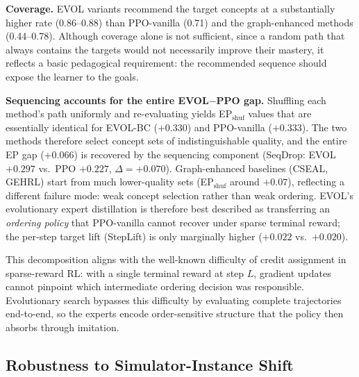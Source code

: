 \documentclass[sigconf,anonymous]{acmart}
\newcommand{\ours}{\textrm{EVOL}}
\begin{document}
\textbf{Coverage.}
\ours{} variants recommend the target concepts at a substantially higher rate (0.86--0.88) than PPO-vanilla (0.71) and the graph-enhanced methods (0.44--0.78). Although coverage alone is not sufficient, since a random path that always contains the targets would not necessarily improve their mastery, it reflects a basic pedagogical requirement: the recommended sequence should expose the learner to the goals.

\textbf{Sequencing accounts for the entire \ours{}$-$PPO gap.}
Shuffling each method's path uniformly and re-evaluating yields EP$_\text{shuf}$ values that are essentially identical for \ours{}-BC ($+0.330$) and PPO-vanilla ($+0.333$). The two methods therefore select concept sets of indistinguishable quality, and the entire EP gap (+0.066) is recovered by the sequencing component (SeqDrop: \ours{} $+0.297$ vs.\ PPO $+0.227$, $\Delta=+0.070$). Graph-enhanced baselines (CSEAL, GEHRL) start from much lower-quality sets (EP$_\text{shuf}$ around $+0.07$), reflecting a different failure mode: weak concept selection rather than weak ordering. \ours{}'s evolutionary expert distillation is therefore best described as transferring an \emph{ordering policy} that PPO-vanilla cannot recover under sparse terminal reward; the per-step target lift (StepLift) is only marginally higher ($+0.022$ vs.\ $+0.020$).

This decomposition aligns with the well-known difficulty of credit assignment in sparse-reward RL: with a single terminal reward at step $L$, gradient updates cannot pinpoint which intermediate ordering decision was responsible. Evolutionary search bypasses this difficulty by evaluating complete trajectories end-to-end, so the experts encode order-sensitive structure that the policy then absorbs through imitation.


\subsection{Robustness to Simulator-Instance Shift}
\label{sec:cross_sim}
\end{document}
